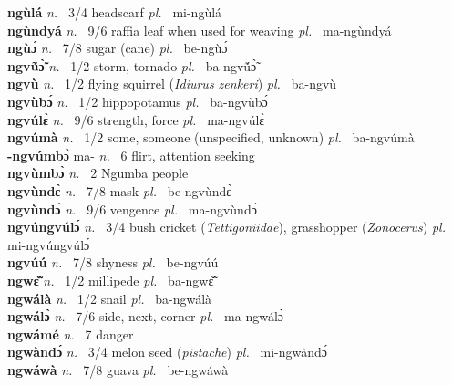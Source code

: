 {\bfseries ngùlá}  {\itshape n.~} 3/4 headscarf {\itshape pl.~} mi-ngùlá    \\ 
{\bfseries ngùndyá}  {\itshape n.~} 9/6 raffia leaf when used for weaving {\itshape pl.~} ma-ngùndyá    \\ 
{\bfseries ngùɔ́}  {\itshape n.~} 7/8 sugar (cane) {\itshape pl.~} be-ngùɔ́    \\ 
{\bfseries ngvṹɔ̃̀}  {\itshape n.~} 1/2 storm, tornado {\itshape pl.~} ba-ngvṹɔ̃̀   \\ 
{\bfseries ngvù}  {\itshape n.~} 1/2 flying squirrel ({\itshape Idiurus zenkeri}) {\itshape pl.~} ba-ngvù    \\ 
{\bfseries ngvùbɔ́}  {\itshape n.~} 1/2 hippopotamus {\itshape pl.~} ba-ngvùbɔ́    \\ 
{\bfseries ngvúlɛ̀}  {\itshape n.~} 9/6 strength, force {\itshape pl.~} ma-ngvúlɛ̀    \\ 
{\bfseries ngvúmà}  {\itshape n.~} 1/2 some, someone (unspecified, unknown) {\itshape pl.~} ba-ngvúmà    \\ 
{\bfseries -ngvúmbɔ̀} ma- {\itshape n.~} 6 flirt, attention seeking    \\ 
{\bfseries ngvùmbɔ̀}  {\itshape n.~} 2 Ngumba people \\ 
{\bfseries ngvùndɛ̀}  {\itshape n.~} 7/8 mask {\itshape pl.~} be-ngvùndɛ̀    \\ 
{\bfseries ngvùndɔ̀}  {\itshape n.~} 9/6 vengence {\itshape pl.~} ma-ngvùndɔ̀    \\ 
{\bfseries ngvúngvúlɔ́}  {\itshape n.~} 3/4 bush cricket ({\itshape Tettigoniidae}), grasshopper ({\itshape Zonocerus}) {\itshape pl.~} mi-ngvúngvúlɔ́    \\ 
{\bfseries ngvúú}  {\itshape n.~} 7/8 shyness {\itshape pl.~} be-ngvúú    \\ 
{\bfseries ngwɛ̃̌}  {\itshape n.~} 1/2 millipede {\itshape pl.~} ba-ngwɛ̃̌    \\ 
{\bfseries ngwálà}  {\itshape n.~} 1/2 snail {\itshape pl.~} ba-ngwálà    \\ 
{\bfseries ngwálɔ̀}  {\itshape n.~} 7/6 side, next, corner {\itshape pl.~} ma-ngwálɔ̀    \\ 
{\bfseries ngwámé}  {\itshape n.~} 7 danger    \\ 
{\bfseries ngwàndɔ́}  {\itshape n.~} 3/4 melon seed ({\itshape pistache}) {\itshape pl.~} mi-ngwàndɔ́    \\ 
{\bfseries ngwáwà}  {\itshape n.~} 7/8 guava {\itshape pl.~} be-ngwáwà    \\ 

